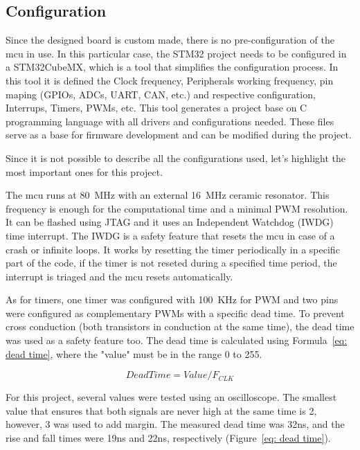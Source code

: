     \subsection{Configuration}
        Since the designed board is custom made, there is no pre-configuration of the \ac{mcu} in use. In this particular case, the STM32 project needs to be configured in a STM32CubeMX, which is a tool that simplifies the configuration process. In this tool it is defined the Clock frequency, Peripherals working frequency, pin maping (GPIOs, ADCs, UART, CAN, etc.) and respective configuration, Interrups, Timers, PWMs, etc. This tool generates a project base on C programming language with all drivers and configurations needed. These files serve as a base for firmware development and can be modified during the project.

        Since it is not possible to describe all the configurations used, let's highlight the most important ones for this project.

        The \ac{mcu} runs at 80~MHz with an external 16~MHz ceramic resonator. This frequency is enough for the computational time and a minimal PWM resolution. It can be flashed using JTAG and it uses an Independent Watchdog (IWDG) time interrupt. The IWDG is a safety feature that resets the \ac{mcu} in case of a crash or infinite loops. It works by resetting the timer periodically in a specific part of the code, if the timer is not reseted during a specified time period, the interrupt is triaged and the \ac{mcu} resets automatically.

        As for timers, one timer was configured with 100~KHz for PWM and two pins were configured as complementary PWMs with a specific dead time. To prevent cross conduction (both transistors in conduction at the same time), the dead time was used as a safety feature too. The dead time is calculated using Formula~\ref{eq: dead time}, where the "value" must be in the range 0 to 255. 

        \begin{equation}
            Dead Time = Value / F_{CLK}
            \label{eq: dead time}
        \end{equation}
        
        For this project, several values were tested using an oscilloscope. The smallest value that ensures that both signals are never high at the same time is 2, however, 3 was used to add margin. The measured dead time was 32ns, and the rise and fall times were 19ns and 22ns, respectively (Figure~\ref{eq: dead time}). 

